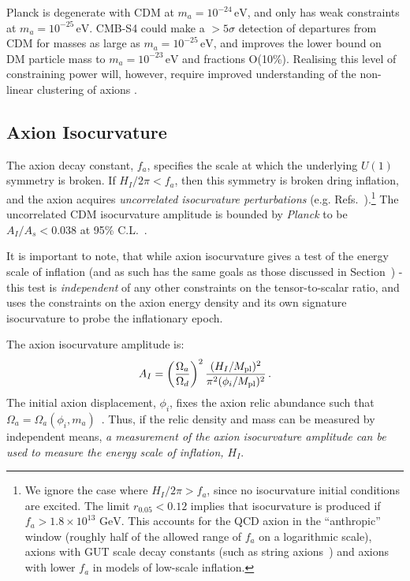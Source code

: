 Planck is degenerate with CDM at $m_a=10^{-24}\,\mathrm{eV}$, and only has weak constraints at $m_a=10^{-25}\,\mathrm{eV}$. CMB-S4 could make a $>5\sigma$ detection of departures from CDM for masses as large as $m_a=10^{-25}\,\mathrm{eV}$, and improves the lower bound on DM particle mass to $m_a=10^{-23}\,\mathrm{eV}$ and fractions O(10\%). Realising this level of constraining power will, however, require improved understanding of the non-linear clustering of axions \cite{Marsh:2016vgj}.

\subsection{Axion Isocurvature \label{axion_iso}}
The axion decay constant, $f_a$, specifies the scale at which the underlying $U(1)$ symmetry is broken. If $H_I/2\pi<f_a$, then this symmetry is broken dring inflation, and the axion acquires \emph{uncorrelated isocurvature perturbations} (e.g. Refs.~\cite{Axenides:1983hj,Fox:2004kb,Hertzberg:2008wr}).\footnote{We ignore the case where $H_I/2\pi>f_a$, since no isocurvature initial conditions are excited. The limit $r_{0.05}<0.12$ implies that isocurvature is produced if $f_a>1.8\times 10^{13}\text{ GeV}$. This accounts for the QCD axion in the ``anthropic'' window (roughly half of the allowed range of $f_a$ on a logarithmic scale), axions with GUT scale decay constants (such as string axions~\cite{Svrcek:2006yi,Arvanitaki:2009fg}) and axions with lower $f_a$ in models of low-scale inflation.} The uncorrelated CDM isocurvature amplitude is bounded by \emph{Planck} to be $A_I/A_s<0.038$ at 95\% C.L.~\cite{Ade:2015lrj}. 

It is important to note, that while axion isocurvature gives a test of the energy scale of inflation (and as such has the same goals as those discussed in Section~\label{sec:scale-of-inflation}) - this test is \textit{independent} of any other constraints on the tensor-to-scalar ratio, and uses the constraints on the axion energy density and its own signature isocurvature to probe the inflationary epoch.

The axion isocurvature amplitude is:
\begin{equation}
A_I = \left(\frac{\Omega_a}{\Omega_d}\right)^2\frac{(H_I/M_{\rm pl})^2}{\pi^2(\phi_i/M_{\rm pl})^2} \, .
\label{eqn:iso_amplitude}
\end{equation}
The initial axion displacement, $\phi_i$, fixes the axion relic abundance such that $\Omega_a=\Omega_a (\phi_i,m_a)$~\cite{Preskill:1982cy,Abbott:1982af,Dine:1982ah,Turner:1983he,Steinhardt:1983ia,Marsh:2010wq}. Thus, if the relic density and mass can be measured by independent means, \emph{a measurement of the axion isocurvature amplitude can be used to measure the energy scale of inflation, $H_I$}.

